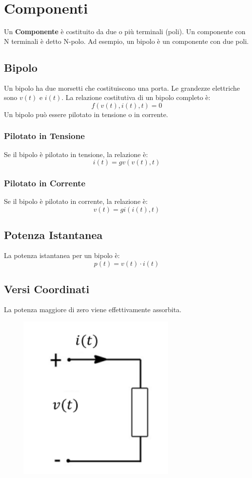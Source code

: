 \section{Componenti}

Un \textbf{Componente} è costituito da due o più terminali (poli). Un componente con N terminali è detto N-polo. Ad esempio, un bipolo è un componente con due poli.

\subsection*{Bipolo}
Un bipolo ha due morsetti che costituiscono una porta. Le grandezze elettriche sono \(v(t)\) e \(i(t)\). La relazione costitutiva di un bipolo completo è:
\[
f(v(t), i(t), t) = 0
\]
Un bipolo può essere pilotato in tensione o in corrente.

\subsubsection*{Pilotato in Tensione}
Se il bipolo è pilotato in tensione, la relazione è:
\[
i(t) = g v(v(t), t)
\]

\subsubsection*{Pilotato in Corrente}
Se il bipolo è pilotato in corrente, la relazione è:
\[
v(t) = g i(i(t), t)
\]

\subsection*{Potenza Istantanea}
La potenza istantanea per un bipolo è:
\[
p(t) = v(t) \cdot i(t)
\]

\subsection*{Versi Coordinati}
La potenza maggiore di zero viene effettivamente assorbita.

\begin{figure}[h!]
    \centering
    \includegraphics[width=0.7\textwidth]{capitoli/capitolo2/immagini/image6.png}
\end{figure}

